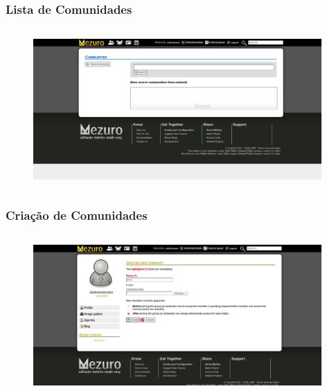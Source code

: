 \documentclass{beamer}
\begin{document}
    \begin{frame}
      \frametitle{Lista de Comunidades}
      \framesubtitle{}
    
      \begin{figure}
        \begin{center}
          \includegraphics[width=11cm, height=6cm]{images/01-community-list.png}
          \label{fig:}
        \end{center}
      \end{figure}
    \end{frame}
    
    \begin{frame}
      \frametitle{Criação de Comunidades}
      \framesubtitle{}
    
      \begin{figure}
        \begin{center}
          \includegraphics[width=11cm, height=6cm]{images/02-community-creation.png}
          \label{fig:}
        \end{center}
      \end{figure}
    \end{frame}
    
\end{document}
